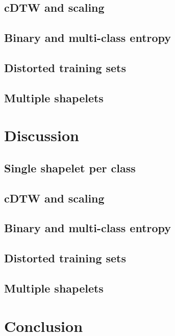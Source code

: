 \subsection{cDTW and scaling}
\subsection{Binary and multi-class entropy}
\subsection{Distorted training sets}
\subsection{Multiple shapelets}

\section{Discussion}
\subsection{Single shapelet per class}
\subsection{cDTW and scaling}
\subsection{Binary and multi-class entropy}
\subsection{Distorted training sets}
\subsection{Multiple shapelets}

\section{Conclusion}

